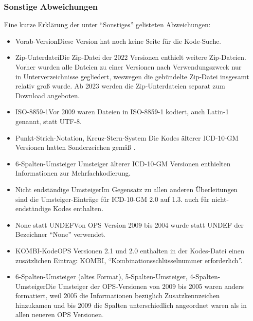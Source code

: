 \subsubsection{Sonstige Abweichungen}
\label{abweichungen}

Eine kurze Erklärung der unter ``Sonstiges'' gelisteten Abweichungen:

\begin{itemize}
\item Vorab-Version\newline Diese Version hat noch keine Seite für die Kode-Suche.
\item Zip-Unterdatei\newline Die Zip-Datei der 2022 Versionen enthielt weitere Zip-Dateien. Vorher wurden alle Dateien zu einer Versionen nach Verwendungszweck nur in Unterverzeichnisse gegliedert, weswegen die gebündelte Zip-Datei insgesamt relativ groß wurde. Ab 2023 werden die Zip-Unterdateien separat zum Download angeboten.
\item ISO-8859-1\newline Vor 2009 waren Dateien in ISO-8859-1 kodiert, auch Latin-1 genannt, statt UTF-8.
\item Punkt-Strich-Notation, Kreuz-Stern-System \newline Die Kodes älterer ICD-10-GM Versionen hatten Sonderzeichen gemäß \citep{bfarmicdkk}.
\item 6-Spalten-Umsteiger \newline Umsteiger älterer ICD-10-GM Versionen enthielten Informationen zur Mehrfachkodierung. 
\item Nicht endständige Umsteiger\newline Im Gegensatz zu allen anderen Überleitungen sind die Umsteiger-Einträge für ICD-10-GM 2.0 auf 1.3. auch für nicht-endständige Kodes enthalten. 
\item None statt UNDEF\newline Von OPS Version 2009 bis 2004 wurde statt UNDEF der Bezeichner ``None'' verwendet. 
\item KOMBI-Kode\newline OPS Versionen 2.1 und 2.0 enthalten in der Kodes-Datei einen zusätzlichen Eintrag: KOMBI, ``Kombinationsschlüsselnummer erforderlich''. 
\item 6-Spalten-Umsteiger (altes Format), 5-Spalten-Umsteiger, 4-Spalten-Umsteiger\newline Die Umsteiger der OPS-Versionen von 2009 bis 2005 waren anders formatiert, weil 2005 die Informationen bezüglich Zusatzkennzeichen hinzukamen und bis 2009 die Spalten unterschiedlich angeordnet waren als in allen neueren OPS Versionen. 

\end{itemize}
